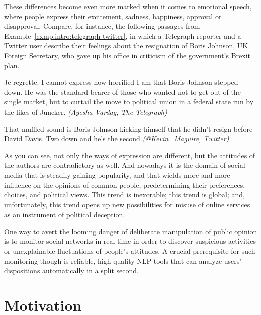 These differences become even more marked when it comes to emotional
speech, where people express their excitement, sadness, happiness,
approval or disapproval.  Compare, for instance, the following
passages from Example~\ref{exmp:intro:telegraph-twitter}, in which a
Telegraph reporter and a Twitter user describe their feelings about
the resignation of Boris Johnson, UK Foreign Secretary, who gave up
his office in criticism of the government's Brexit plan.
\begin{example}\label{exmp:intro:telegraph-twitter}
Je regrette. I cannot express how horrified I am that Boris Johnson
stepped down. He was the standard-bearer of those who wanted not to
get out of the single market, but to curtail the move to political
union in a federal state run by the likes of Juncker. \emph{(Ayesha
  Vardag, The Telegraph)}

\noindent{}That muffled sound is Boris Johnson kicking himself that he
didn't resign before David Davis. Two down and he's the second
\emph{(@Kevin\_Maguire, Twitter)}
\end{example}
As you can see, not only the ways of expression are different, but the
attitudes of the authors are contradictory as well. And nowadays it is
the domain of social media that is steadily gaining popularity, and
that wields more and more influence on the opinions of common people,
predetermining their preferences, choices, and political views.  This
trend is inexorable; this trend is global; and, unfortunately, this
trend opens up new possibilities for misuse of online services as an
instrument of political deception.

One way to avert the looming danger of deliberate manipulation of
public opinion is to monitor social networks in real time in order to
discover suspicious activities or unexplainable fluctuations of
people's attitudes.  A crucial prerequisite for such monitoring though
is reliable, high-quality NLP tools that can analyze users'
dispositions automatically in a split second.

\section*{Motivation}

